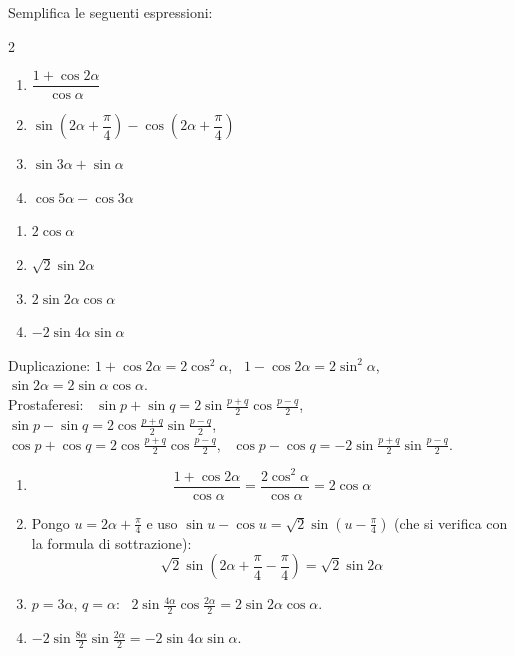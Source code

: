 
\begin{question}[ID=2.1, subtitle={Semplificazione con formule di duplicazione e prostaferesi}, tags={goniometria, formule di duplicazione, prostaferesi}, difficulty=facile]
Semplifica le seguenti espressioni:
\begin{multicols}{2}
\begin{enumerate}
\item $\dfrac{1 + \cos 2\alpha}{\cos \alpha}$
\item $\sin\!\left(2\alpha + \dfrac{\pi}{4}\right) - \cos\!\left(2\alpha + \dfrac{\pi}{4}\right)$
\item $\sin 3\alpha + \sin \alpha$
\item $\cos 5\alpha - \cos 3\alpha$
\end{enumerate}
\end{multicols}
\begin{solution}
\begin{enumerate}
    \item $2\cos\alpha$
    \item $\sqrt2\sin2\alpha$
    \item $2\sin2\alpha\cos\alpha$
    \item $-2\sin4\alpha\sin\alpha$
\end{enumerate}
\end{solution}
\begin{explanation}
Duplicazione: $1+\cos2\alpha=2\cos^2\alpha$, \ $1-\cos2\alpha=2\sin^2\alpha$, \ $\sin2\alpha=2\sin\alpha\cos\alpha$. \\
Prostaferesi: \ $\sin p+\sin q=2\sin\tfrac{p+q}{2}\cos\tfrac{p-q}{2}$, \ $\sin p-\sin q=2\cos\tfrac{p+q}{2}\sin\tfrac{p-q}{2}$, \\
$\cos p+\cos q=2\cos\tfrac{p+q}{2}\cos\tfrac{p-q}{2}$, \ $\cos p-\cos q=-2\sin\tfrac{p+q}{2}\sin\tfrac{p-q}{2}$.
\begin{enumerate}
    \item \[ \dfrac{1+\cos2\alpha}{\cos\alpha}=\dfrac{2\cos^2\alpha}{\cos\alpha}=2\cos\alpha \]
    \item Pongo $u=2\alpha+\tfrac\pi4$ e uso $\sin u-\cos u=\sqrt2\sin\left(u-\tfrac\pi4\right)$ (che si verifica con la formula di sottrazione):
    \[ \sqrt2\sin\left(2\alpha+\dfrac\pi4-\dfrac\pi4\right)=\sqrt2\sin2\alpha \]
    \item $p=3\alpha$, $q=\alpha$: \ $2\sin\tfrac{4\alpha}{2}\cos\tfrac{2\alpha}{2}=2\sin2\alpha\cos\alpha$.
    \item $-2\sin\tfrac{8\alpha}{2}\sin\tfrac{2\alpha}{2}=-2\sin4\alpha\sin\alpha$.
\end{enumerate}
\end{explanation}
\end{question}

